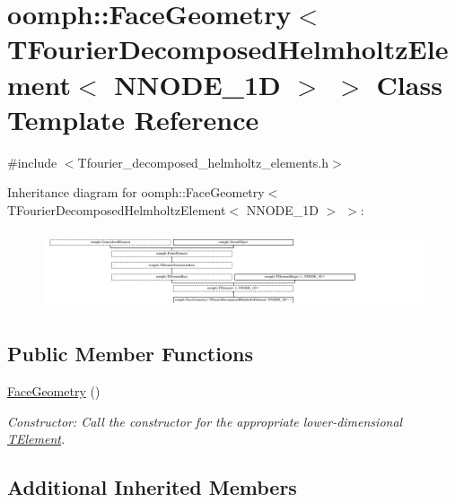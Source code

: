 \hypertarget{classoomph_1_1FaceGeometry_3_01TFourierDecomposedHelmholtzElement_3_01NNODE__1D_01_4_01_4}{}\section{oomph\+:\+:Face\+Geometry$<$ T\+Fourier\+Decomposed\+Helmholtz\+Element$<$ N\+N\+O\+D\+E\+\_\+1D $>$ $>$ Class Template Reference}
\label{classoomph_1_1FaceGeometry_3_01TFourierDecomposedHelmholtzElement_3_01NNODE__1D_01_4_01_4}


{\ttfamily \#include $<$Tfourier\+\_\+decomposed\+\_\+helmholtz\+\_\+elements.\+h$>$}

Inheritance diagram for oomph\+:\+:Face\+Geometry$<$ T\+Fourier\+Decomposed\+Helmholtz\+Element$<$ N\+N\+O\+D\+E\+\_\+1D $>$ $>$\+:\begin{figure}[H]
\begin{center}
\leavevmode
\includegraphics[height=2.323651cm]{classoomph_1_1FaceGeometry_3_01TFourierDecomposedHelmholtzElement_3_01NNODE__1D_01_4_01_4}
\end{center}
\end{figure}
\subsection*{Public Member Functions}
\begin{DoxyCompactItemize}
\item 
\hyperlink{classoomph_1_1FaceGeometry_3_01TFourierDecomposedHelmholtzElement_3_01NNODE__1D_01_4_01_4_a9861ed10cee3b5646a3efbcc021f44e2}{Face\+Geometry} ()
\begin{DoxyCompactList}\small\item\em Constructor\+: Call the constructor for the appropriate lower-\/dimensional \hyperlink{classoomph_1_1TElement}{T\+Element}. \end{DoxyCompactList}\end{DoxyCompactItemize}
\subsection*{Additional Inherited Members}


